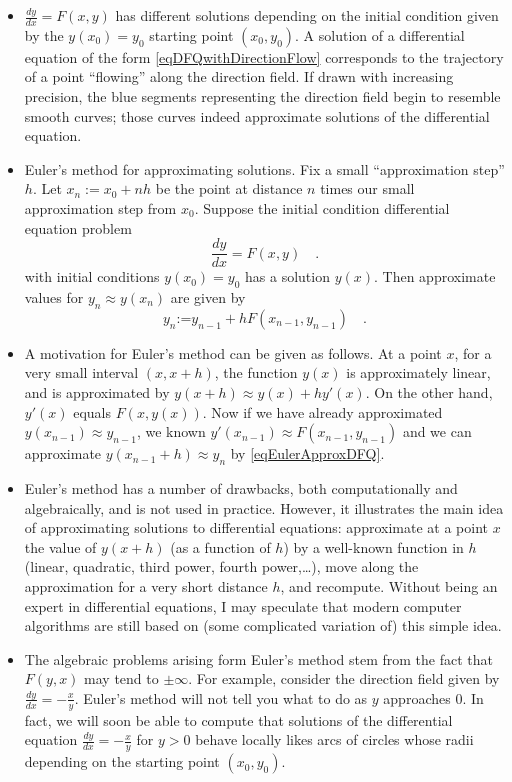 \documentclass[12pt]{book}
\newcommand{\eqdef}{\textbf{:=}}
\begin{document}
\begin{itemize}
\item $\frac{dy}{dx}= F(x,y)$ has different solutions depending on the initial condition given by the $y(x_0)=y_0$ starting point $(x_0, y_0)$. A solution of a differential equation of the form \eqref{eqDFQwithDirectionFlow} corresponds to the trajectory of a point ``flowing'' along the direction field. If drawn with increasing precision, the blue segments representing the direction field begin to resemble smooth curves; those curves indeed approximate solutions of the differential equation.
\item Euler's method for approximating solutions. Fix a small ``approximation step'' $h$. Let $x_n:=x_0+nh$ be the point at distance $n$ times our small approximation step from $x_0$. Suppose the initial condition differential equation problem
\[
\frac{dy}{dx}= F(x,y)\quad.  
\]
with initial conditions $y(x_0)=y_0$  has a solution $y(x)$. Then approximate values for $y_n\approx y(x_n)$ are given by
\begin{equation}\label{eqEulerApproxDFQ}
y_n \eqdef y_{n-1} + h F(x_{n-1}, y_{n-1})\quad .
\end{equation}
\item A motivation for Euler's method can be given as follows. At a point $x$, for a very small interval $(x,x+h)$, the function $y(x)$ is approximately linear, and is approximated by $y(x+h)\approx y(x)+ h y'(x) $. On the other hand, $y'(x)$ equals $F(x, y(x))$. Now if we have already approximated $y(x_{n-1})\approx y_{n-1}$, we known $y'(x_{n-1}) \approx F(x_{n-1}, y_{n-1})$ and  we can approximate $y(x_{n-1}+h)\approx y_n $ by \eqref{eqEulerApproxDFQ}.
\item Euler's method has a number of drawbacks, both computationally and algebraically, and is not used in practice. However, it illustrates the main idea of approximating solutions to differential equations: approximate at a point $x$ the value of $y(x+h)$ (as a function of $h$) by a well-known function in $h$ (linear, quadratic, third power, fourth power,\dots), move along the approximation for a very short distance $h$, and recompute. Without being an expert in differential equations, I may speculate that modern computer algorithms  are still based on (some complicated variation of) this simple idea.
\item The algebraic problems arising form Euler's method stem from the fact that $F(y,x)$ may tend to $\pm\infty$. For example, consider the direction field given by $\frac{dy}{dx}= -\frac{x}{y}$. Euler's method will not tell you what to do as $y$ approaches $0$. In fact, we will soon be able to compute that solutions of the differential equation  $\frac{dy}{dx}= -\frac{x}{y}$ for $y>0$ behave locally likes arcs of circles whose radii depending on the starting point $(x_0, y_0)$.


\end{itemize}
\end{document}
